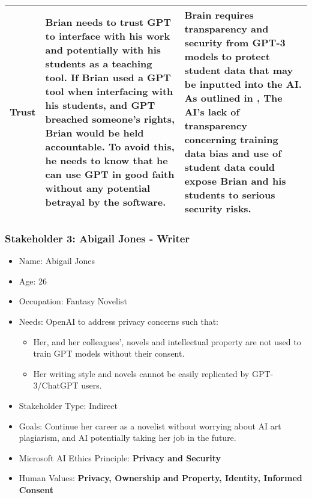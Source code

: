 \begin{longtable}{|p{}|p{}|p{}|}
\hline
Trust & Brian needs to trust GPT to interface with his work and potentially with his students as a teaching tool. If Brian used a GPT tool when interfacing with his students, and GPT breached someone's rights, Brian would be held accountable. To avoid this, he needs to know that he can use GPT in good faith without any potential betrayal by the software. & Brain requires transparency and security from GPT-3 models to protect student data that may be inputted into the AI. As outlined in \textcite{Kikalishvili2023}, The AI’s lack of transparency concerning training data bias and use of student data could expose Brian and his students to serious security risks. \\
\hline

\end{longtable}

\subsubsection{Stakeholder 3: Abigail Jones - Writer}

\begin{itemize}
\item Name: Abigail Jones
\item Age: 26
\item Occupation: Fantasy Novelist
\item Needs: OpenAI to address privacy concerns such that:
  \begin{itemize}
  \item Her, and her colleagues', novels and intellectual property are not used to train GPT models without their consent.
  \item Her writing style and novels cannot be easily replicated by GPT-3/ChatGPT users.
  \end{itemize}
\item Stakeholder Type: Indirect
\item Goals: Continue her career as a novelist without worrying about AI art plagiarism, and AI potentially taking her job in the future.
\item Microsoft AI Ethics Principle: \textbf{Privacy and Security}
\item Human Values: \textbf{Privacy, Ownership and Property, Identity, Informed Consent}
\end{itemize}

